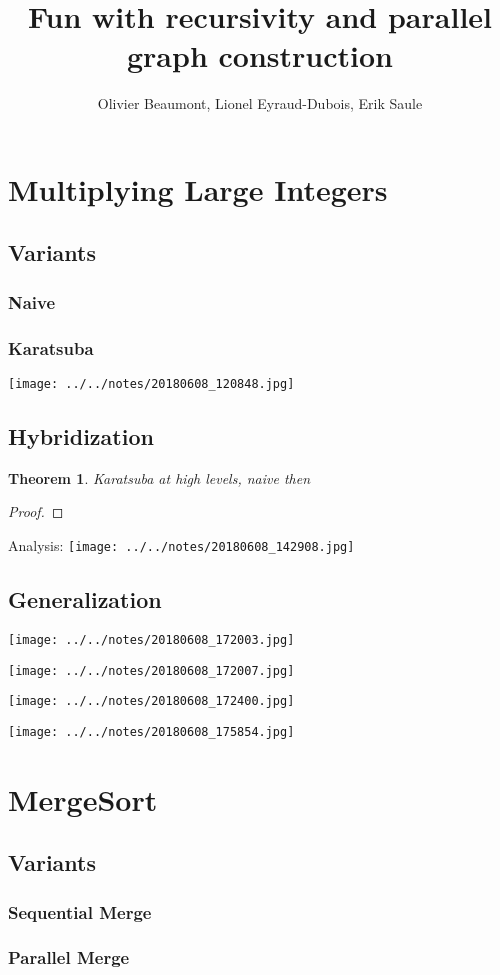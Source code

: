 \documentclass{article}
\author{Olivier Beaumont, Lionel Eyraud-Dubois, Erik Saule}
\title{Fun with recursivity and parallel graph construction}
\newtheorem{theorem}{Theorem}
\begin{document}
\maketitle

\section{Multiplying Large Integers}

\subsection{Variants}

\subsubsection{Naive}

\subsubsection{Karatsuba}

\texttt{[image: ../../notes/20180608\_120848.jpg]}

\subsection{Hybridization}

\begin{theorem}
Karatsuba at high levels, naive then
\end{theorem}

\begin{proof}
\end{proof}

Analysis: \texttt{[image: ../../notes/20180608\_142908.jpg]}

\subsection{Generalization}

\texttt{[image: ../../notes/20180608\_172003.jpg]}

\texttt{[image: ../../notes/20180608\_172007.jpg]}

\texttt{[image: ../../notes/20180608\_172400.jpg]}

\texttt{[image: ../../notes/20180608\_175854.jpg]}

\section{MergeSort}

\subsection{Variants}

\subsubsection{Sequential Merge}

\subsubsection{Parallel Merge}
\end{document}
